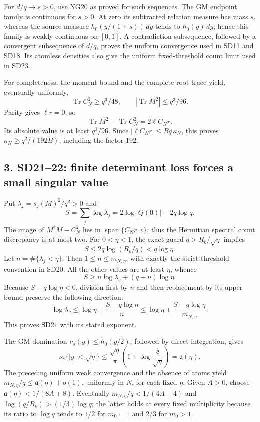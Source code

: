 \documentclass[11pt]{article}
\begin{document}
For \(d/q\to s>0\), use NG20 as proved for such sequences. The GM endpoint family is continuous for \(s>0\). At zero its subtracted relation measure has mass \(s\), whereas the source measure \(h_0(y/(1+s))\,dy\) tends to \(h_0(y)\,dy\); hence this family is weakly continuous on \([0,1]\). A contradiction subsequence, followed by a convergent subsequence of \(d/q\), proves the uniform convergence used in SD11 and SD18. Its atomless densities also give the uniform fixed-threshold count limit used in SD23.

For completeness, the moment bound and the complete root trace yield, eventually uniformly, \[
\operatorname{Tr}C_N^2\ge q^3/48,\qquad
|\operatorname{Tr}M^2|\le q^3/96.
\] Parity gives \(\ell r=0\), so \[
\operatorname{Tr}M^2-\operatorname{Tr}C_N^2=2\ell C_Nr.
\] Its absolute value is at least \(q^3/96\). Since \(|\ell C_Nr|\le Bq\,\kappa_N\), this proves \(\kappa_N\ge q^2/(192B)\), including the factor \(192\).

\subsection{3. SD21--22: finite determinant loss forces a small singular value}\label{osdind:sd2122-finite-determinant-loss-forces-a-small-singular-value}

Put \(\lambda_j=s_j(M)^2/q^2>0\) and \[
S=\sum_j\log\lambda_j=2\log|Q(0)|-2q\log q.
\] The image of \(M^\dagger M-C_N^2\) lies in \(\operatorname{span}\{C_Nr,v\}\); thus the Hermitian spectral count discrepancy is at most two. For \(0<\eta<1\), the exact guard \(q>R_k/\sqrt\eta\) implies \[
S\le2q\log(R_k/q)<q\log\eta.
\] Let \(n=\#\{\lambda_j<\eta\}\). Then \(1\le n\le m_{N,\eta}\), with exactly the strict-threshold convention in SD20. All the other values are at least \(\eta\), whence \[
S\ge n\log\lambda_q+(q-n)\log\eta.
\] Because \(S-q\log\eta<0\), division first by \(n\) and then replacement by its upper bound preserve the following direction: \[
\log\lambda_q\le\log\eta+\frac{S-q\log\eta}{n}
\le\log\eta+\frac{S-q\log\eta}{m_{N,\eta}}.
\] This proves SD21 with its stated exponent.

The GM domination \(\nu_s(y)\le h_0(y/2)\), followed by direct integration, gives \[
\nu_s\{|y|<\sqrt\eta\}
\le \frac{\sqrt\eta}{\pi}
          \left(1+\log\frac8{\sqrt\eta}\right)=\mathfrak a(\eta).
\] The preceding uniform weak convergence and the absence of atoms yield \(m_{N,\eta}/q\le\mathfrak a(\eta)+o(1)\), uniformly in \(N\), for each fixed \(\eta\). Given \(A>0\), choose \(\mathfrak a(\eta)<1/(8A+8)\). Eventually \(m_{N,\eta}/q<1/(4A+4)\) and \(\log(q/R_k)>(1/3)\log q\); the latter holds at every fixed multiplicity because its ratio to \(\log q\) tends to \(1/2\) for \(m_0=1\) and \(2/3\) for \(m_0>1\).
\end{document}
